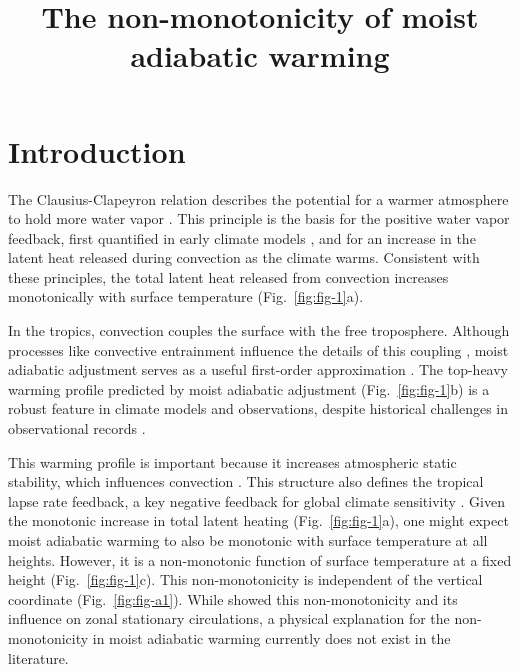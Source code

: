 \documentclass[draft]{ametsocV6.1}
\title{The non-monotonicity of moist adiabatic warming}
\affiliation{\aff{a}{Department of Geosciences, Union College, Schenectady New York, USA}}
\begin{document}
\maketitle

%
\section{Introduction}

The Clausius-Clapeyron relation describes the potential for a warmer atmosphere to hold more water vapor \citep{emanuel1994}. This principle is the basis for the positive water vapor feedback, first quantified in early climate models \citep{manabe1967}, and for an increase in the latent heat released during convection as the climate warms. Consistent with these principles, the total latent heat released from convection increases monotonically with surface temperature (Fig.~\ref{fig:fig-1}a).

In the tropics, convection couples the surface with the free troposphere. Although processes like convective entrainment influence the details of this coupling \citep{miyawaki2020}, moist adiabatic adjustment serves as a useful first-order approximation \citep{held1993}. The top-heavy warming profile predicted by moist adiabatic adjustment (Fig.~\ref{fig:fig-1}b) is a robust feature in climate models and observations, despite historical challenges in observational records \citep{vallis2015, santer2005}.

This warming profile is important because it increases atmospheric static stability, which influences convection \citep{neelin1987}. This structure also defines the tropical lapse rate feedback, a key negative feedback for global climate sensitivity \citep{hansen1984}. Given the monotonic increase in total latent heating (Fig.~\ref{fig:fig-1}a), one might expect moist adiabatic warming to also be monotonic with surface temperature at all heights. However, it is a non-monotonic function of surface temperature at a fixed height (Fig.~\ref{fig:fig-1}c). This non-monotonicity is independent of the vertical coordinate (Fig.~\ref{fig:fig-a1}). While \citet{levine2016} showed this non-monotonicity and its influence on zonal stationary circulations, a physical explanation for the non-monotonicity in moist adiabatic warming currently does not exist in the literature.
\end{document}
